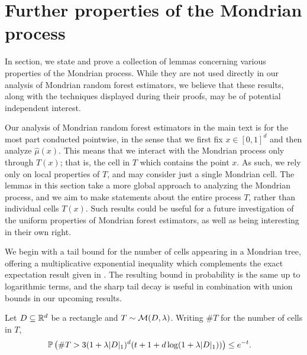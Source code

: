 \section{Further properties of the Mondrian process}

In section, we state and prove a collection of lemmas concerning
various properties of the Mondrian process. While they are not used directly
in our analysis of Mondrian random forest estimators, we believe that
these results, along with the techniques displayed during their proofs,
may be of potential independent interest.

Our analysis of Mondrian random forest estimators in the main text
is for the most part
conducted pointwise, in the sense that we first fix $x \in [0,1]^d$
and then analyze $\hat\mu(x)$. This means that we interact with the Mondrian
process
only through $T(x)$; that is, the cell in $T$ which contains the point $x$.
As such, we rely only on local properties of $T$, and may consider just a
single Mondrian cell. The lemmas in this section take a more global approach
to analyzing the Mondrian process, and we aim to make statements about the
entire process $T$, rather than individual cells $T(x)$.
Such results could be useful for a future investigation of the uniform
properties of Mondrian forest estimators, as well as
being interesting in their own right.


We begin with a tail bound for the number of cells appearing
in a Mondrian tree, offering a multiplicative
exponential inequality which
complements the exact expectation result given in
\citet[Proposition~2]{mourtada2020minimax}.
The resulting bound in probability is the same up to
logarithmic terms, and the sharp tail decay is useful
in combination with union bounds in our upcoming results.

\begin{lemma}
  \label{lem:cells_tail}

  Let $D \subseteq \R^d$ be a rectangle and
  $T \sim \cM(D, \lambda)$. Writing
  $\# T$ for the number of cells in $T$,
  \begin{align*}
    \P\left(
      \# T > 3 (1 + \lambda |D|_1)^d
      (t + 1 + d \log(1 + \lambda |D|_1))
    \right)
    &\leq
    e^{-t}.
  \end{align*}

\end{lemma}

